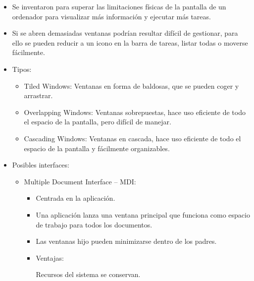 \documentclass[12pt, twoside, openright]{report} %
\begin{document}
        \begin{itemize}
        
        \item
          Se inventaron para superar las limitaciones físicas de la
          pantalla de un ordenador para visualizar más información y
          ejecutar más tareas.
        \item
          Si se abren demasiadas ventanas podrían resultar difícil de
          gestionar, para ello se pueden reducir a un icono en la barra
          de tareas, listar todas o moverse fácilmente.
        \item
          Tipos:

          \begin{itemize}
          
          \item
            Tiled Windows: Ventanas en forma de baldosas, que se pueden
            coger y arrastrar.
          \item
            Overlapping Windows: Ventanas sobrepuestas, hace uso
            eficiente de todo el espacio de la pantalla, pero difícil de
            manejar.
          \item
            Cascading Windows: Ventanas en cascada, hace uso eficiente
            de todo el espacio de la pantalla y fácilmente organizables.
          \end{itemize}
        \item
          Posibles interfaces:

          \begin{itemize}
          
          \item
            Multiple Document Interface -- MDI:

            \begin{itemize}
            
            \item
              Centrada en la aplicación.
            \item
              Una aplicación lanza una ventana principal que funciona
              como espacio de trabajo para todos los documentos.
            \item
              Las ventanas hijo pueden minimizarse dentro de los padres.
            \item
              Ventajas:

                Recursos del sistema se conservan.


\end{itemize}
\end{itemize}
\end{itemize}
\end{document}
